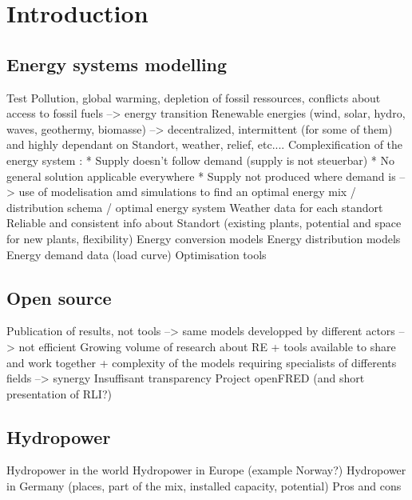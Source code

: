 \chapter{Introduction}
\label{chap:introduction}

\section{Energy systems modelling}
Test
Pollution, global warming, depletion of fossil ressources, conflicts about access to fossil fuels --> energy transition \newline
Renewable energies (wind, solar, hydro, waves, geothermy, biomasse) --> decentralized, intermittent (for some of them) and highly dependant on Standort, weather, relief, etc.... \newline
Complexification of the energy system :\newline
* Supply doesn't follow demand (supply is not steuerbar)\newline
* No general solution applicable everywhere\newline
* Supply not produced where demand is\newline
--> use of modelisation amd simulations to find an optimal energy mix / distribution schema / optimal energy system\newline
Weather data for each standort\newline
Reliable and consistent info about Standort (existing plants, potential and space for new plants, flexibility)\newline
Energy conversion models\newline
Energy distribution models\newline
Energy demand data (load curve)\newline
Optimisation tools\newline

\section{Open source}
Publication of results, not tools --> same models developped by different actors --> not efficient  \newline
Growing volume of research about RE + tools available to share and work together + complexity of the models requiring specialists of differents fields --> synergy \newline
Insuffisant transparency \newline
Project openFRED (and short presentation of RLI?)\newline

\section{Hydropower}
Hydropower in the world \newline
Hydropower in Europe (example Norway?) \newline
Hydropower in Germany (places, part of the mix, installed capacity, potential) \newline
Pros and cons \newline

